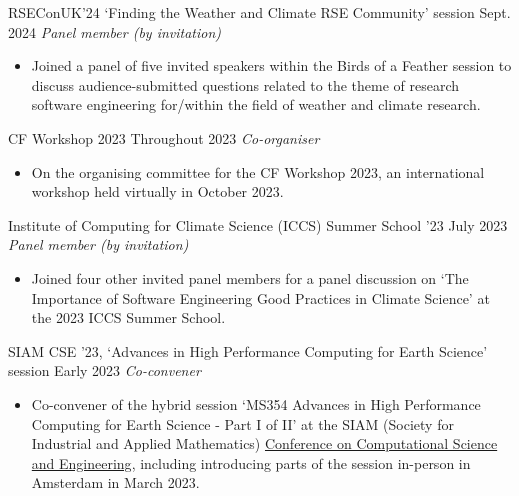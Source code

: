 
\begin{projects}

\projecta
	{RSEConUK'24 `Finding the Weather and Climate RSE Community' session \lbrack\href{https://society-rse.org/weather-and-climate-rsecon24-birds-of-a-feather-session-retrospective-blog-post/}{\small{\websiteSymbol}}\rbrack}{Sept. 2024}
	{
	    \textit{Panel member (by invitation)}
	}
	{
    \begin{itemize}
        \item Joined a panel of five invited speakers within the Birds of a Feather session to discuss audience-submitted questions related to the theme of research software engineering for/within the field of weather and climate research.
    \end{itemize}}

\projecta
	{CF Workshop 2023 \lbrack\href{https://cfconventions.org/Meetings/2023-Workshop.html}{\small{\websiteSymbol}}\rbrack}{Throughout 2023}
	{
	    \textit{Co-organiser}
	}
	{\begin{itemize}
     \item On the organising committee for the CF Workshop 2023, an international workshop held virtually in October 2023.
     \end{itemize}}

\projecta
	{Institute of Computing for Climate Science (ICCS) Summer School '23 \lbrack\href{https://iccs.cam.ac.uk/events/iccs-summer-school-2023}{\small{\websiteSymbol}}\rbrack}{July 2023}
	{
	    \textit{Panel member (by invitation)}
	}
	{
    \begin{itemize}
        \item Joined four other invited panel members for a panel discussion on `The Importance of Software Engineering Good Practices in Climate Science' at the 2023 ICCS Summer School.
    \end{itemize}}


\projecta
	{SIAM CSE '23, `Advances in High Performance Computing for Earth Science' session \lbrack\href{https://meetings.siam.org/sess/dsp_programsess.cfm?SESSIONCODE=75467}{\small{\websiteSymbol}}\rbrack}{Early 2023}
	{
	    \textit{Co-convener}
	}
	{\begin{itemize}
     \item Co-convener of the hybrid session `MS354 Advances in High Performance Computing for Earth Science - Part I of II' at the SIAM (Society for Industrial and Applied Mathematics) \href{https://www.siam.org/conferences-events/past-event-archive/cse23/}{Conference on Computational Science and Engineering}, including introducing parts of the session in-person in Amsterdam in March 2023.
     \end{itemize}
     }


\end{projects}
